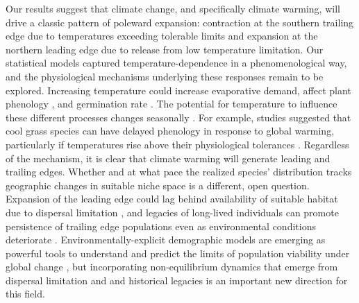 \documentclass[9pt,twocolumn,twoside,lineno]{pnas-new}
\begin{document}
Our results suggest that climate change, and specifically climate warming, will drive a classic pattern of poleward expansion: contraction at the southern trailing edge due to temperatures exceeding tolerable limits and expansion at the northern leading edge due to release from low temperature limitation. 
Our statistical models captured temperature-dependence in a phenomenological way, and the physiological mechanisms underlying these responses remain to be explored. 
Increasing temperature could increase evaporative demand, affect plant phenology \citep{mclean2016predicting,iler2019reproductive}, and germination rate \citep{reed2021climate}.
The potential for temperature to influence these different processes changes seasonally \citep{konapala2020climate}.
For example, studies suggested that cool grass species can have delayed phenology in response to global warming, particularly if temperatures rise above their physiological tolerances \citep{ williams2015life}.
Regardless of the mechanism, it is clear that climate warming will generate leading and trailing edges. 
Whether and at what pace the realized species' distribution tracks geographic changes in suitable niche space is a different, open question. 
Expansion of the leading edge could lag behind availability of suitable habitat due to dispersal limitation \citep{pagel2020mismatches}, and legacies of long-lived individuals can promote persistence of trailing edge populations even as environmental conditions deteriorate \citep{margaret2023trailing}. 
Environmentally-explicit demographic models are emerging as powerful tools to understand and predict the limits of population viability under global change \citep{schultz2022climate, merow2017climate}, but incorporating  non-equilibrium dynamics that emerge from dispersal limitation and and historical legacies is an important new direction for this field.
\end{document}
